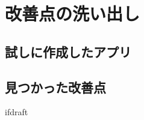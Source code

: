 \documentclass{jsarticle}
\begin{document}
    \fi
    \section{改善点の洗い出し}
    \subsection{試しに作成したアプリ}
    \subsection{見つかった改善点}


%
%




    \expandafter\ifx\csname ifdraft\endcsname\relax
\end{document}
